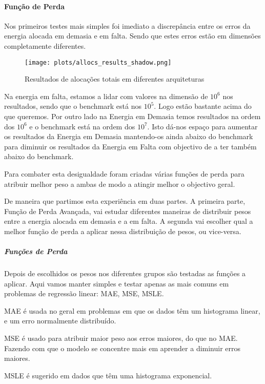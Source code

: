 \paragraph{Função de Perda}
\text{ }  \par

Nos primeiros testes mais simples foi imediato a discrepância entre os erros da energia alocada em demasia e em falta. Sendo que estes erros estão em dimensões completamente diferentes.
\begin{figure}[H]
    \centering
    \texttt{[image: plots/allocs\_results\_shadow.png]}
    \caption{Resultados de alocações totais em diferentes arquiteturas}
    \label{fig:resexparchs}
  \end{figure}

Na energia em falta, estamos a lidar com valores na dimensão de $10^{6}$ nos resultados, sendo que o benchmark está nos $10^{5}$. Logo estão bastante acima do que queremos. Por outro lado na Energia em Demasia temos resultados na ordem dos $10^{6}$ e o benchmark está na ordem dos $10^{7}$. Isto dá-nos espaço para aumentar os resultados da Energia em Demasia mantendo-os ainda abaixo do benchmark para diminuir os resultados da Energia em Falta com objectivo de a ter também abaixo do benchmark.\par
Para combater esta desigualdade foram criadas várias funções de perda para atribuir melhor peso a ambas de modo a atingir melhor o objectivo geral.\par
De maneira que partimos esta experiência em duas partes. A primeira parte, Função de Perda Avançada, vai estudar diferentes maneiras de distribuir pesos entre a energia alocada em demasia e a em falta. A segunda vai escolher qual a melhor função de perda a aplicar nessa distribuição de pesos, ou vice-versa.\par


\subparagraph{Funções de Perda}
\text{ }  \par
Depois de escolhidos os pesos nos diferentes grupos são testadas as funções a aplicar. Aqui vamos manter simples e testar apenas as mais comuns em problemas de regressão linear: \gls{MAE}, \gls{MSE}, \gls{MSLE}.\par
\gls{MAE} é usada no geral em problemas em que os dados têm um histograma linear, e um erro normalmente distribuído.\par
\gls{MSE} é usado para atribuir maior peso aos erros maiores, do que no \gls{MAE}. Fazendo com que o modelo se concentre mais em aprender a diminuir erros maiores.\par
\gls{MSLE} é sugerido em dados que têm uma histograma exponencial.\par

